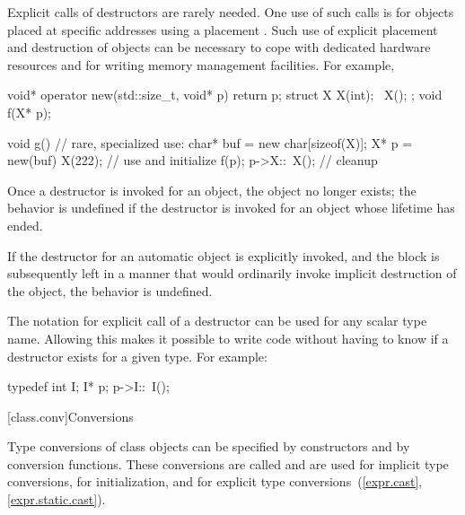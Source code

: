 \pnum
\begin{note}
%
Explicit calls of destructors are rarely needed.
One use of such calls is for objects placed at specific
addresses using a placement
.
Such use of explicit placement and destruction of objects can be necessary
to cope with dedicated hardware resources and for writing memory management
facilities.
For example,
\begin{codeblock}
void* operator new(std::size_t, void* p) { return p; }
struct X {
  X(int);
  ~X();
};
void f(X* p);

void g() {                      // rare, specialized use:
  char* buf = new char[sizeof(X)];
  X* p = new(buf) X(222);       // use  and initialize
  f(p);
  p->X::~X();                   // cleanup
}
\end{codeblock}
\end{note}

\pnum
Once a destructor is invoked for an object, the object no longer exists;
the behavior is undefined if the destructor is invoked
for an object whose lifetime has ended.
\begin{example}
If the destructor for an automatic object is explicitly invoked,
and the block is subsequently left in a manner that would ordinarily
invoke implicit destruction of the object, the behavior is undefined.
\end{example}

\pnum
\begin{note}
%
The notation for explicit call of a destructor can be used for any scalar type
name.
Allowing this makes it possible to write code without having to know if a
destructor exists for a given type.
For example:
\begin{codeblock}
typedef int I;
I* p;
p->I::~I();
\end{codeblock}
\end{note}

[class.conv]{Conversions}

\pnum
{}%
%
%
%
Type conversions of class objects can be specified by constructors and
by conversion functions.
These conversions are called
and are used for implicit type conversions,
for initialization,
and for explicit type conversions~(\ref{expr.cast}, \ref{expr.static.cast}).

